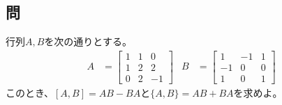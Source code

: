 \subsection{問}
行列$A,B$を次の通りとする。
\begin{align}
	A
&=
	\left[
	\begin{array}{ccc}
		 1 &  1 &  0 \\
		 1 &  2 &  2 \\
		 0 &  2 & -1
	\end{array}
	\right] &
%
%
	B
&=
	\left[
	\begin{array}{ccc}
		 1 & -1 &  1 \\
		-1 &  0 &  0 \\
		 1 &  0 &  1
	\end{array}
	\right]
\end{align}
このとき、$[A,B]=AB-BA$と$\{A,B\}=AB+BA$を求めよ。

